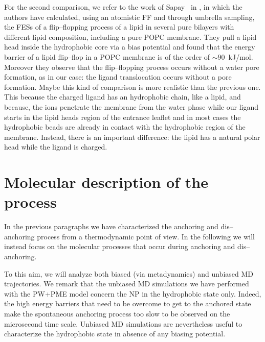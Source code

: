 For the second comparison, we refer to the work of Sapay \etal\, in \cite{Sapay2009}, in which the authors have calculated, using an atomistic \ac{FF} and through umbrella sampling, the \acp{FES} of a flip--flopping process of a lipid in several pure bilayers with different lipid composition, including a pure \ac{POPC} membrane. They pull a lipid head inside the hydrophobic core via a bias potential and found that the energy barrier of a lipid flip--flop in a \ac{POPC} membrane is of the order of $\sim 90$~kJ/mol. Moreover they observe that the flip--flopping process occurs without a water pore formation, as in our case: the  ligand translocation occurs without a pore formation. Maybe this kind of comparison is more realistic than the previous one. This because the charged ligand has an hydrophobic chain, like a lipid, and because, the ions penetrate the membrane from the water phase while our ligand starts in the lipid heads region of the entrance leaflet and in most cases the hydrophobic beads are already in contact with the hydrophobic region of the membrane. Instead, there is an important difference: the lipid has a natural polar head while the ligand is charged.

\section{Molecular description of the process}
\label{sec:resultsUnBiased}
In the previous paragraphs we have characterized the anchoring and dis--anchoring process from a thermodynamic point of view. In the following we will instead focus on the molecular processes that occur during anchoring and dis--anchoring.

To this aim, we will analyze both biased (via metadynamics) and unbiased \ac{MD} trajectories. We remark that the unbiased \ac{MD} simulations we have performed with the \ac{PW}+\ac{PME} model concern the \ac{NP} in the hydrophobic state only. Indeed, the high energy barriers that need to be overcome to get to the anchored state make the spontaneous anchoring process too slow to be observed on the microsecond time scale. Unbiased \ac{MD} simulations are nevertheless useful to characterize the hydrophobic state in absence of any biasing potential. 

